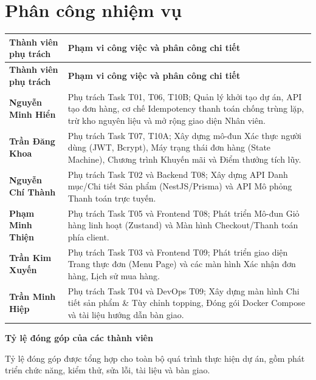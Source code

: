 \documentclass[12pt,a4paper]{report}
\begin{document}
\section{Phân công nhiệm vụ}

\begingroup
\small
\setlength{\tabcolsep}{5pt}
\renewcommand{\arraystretch}{1.2}
\begin{longtable}{|>{\raggedright\arraybackslash}p{}|>{\raggedright\arraybackslash}p{}|}
\hline
\textbf{Thành viên phụ trách} & \textbf{Phạm vi công việc và phân công chi tiết} \\ \hline
\endfirsthead
\hline
\textbf{Thành viên phụ trách} & \textbf{Phạm vi công việc và phân công chi tiết} \\ \hline
\endhead
\endfoot
\endlastfoot
\textbf{Nguyễn Minh Hiển} & Phụ trách Task T01, T06, T10B; Quản lý khởi tạo dự án, API tạo đơn hàng, cơ chế Idempotency thanh toán chống trùng lặp, trừ kho nguyên liệu và mở rộng giao diện Nhân viên. \\ \hline
\textbf{Trần Đăng Khoa} & Phụ trách Task T07, T10A; Xây dựng mô-đun Xác thực người dùng (JWT, Bcrypt), Máy trạng thái đơn hàng (State Machine), Chương trình Khuyến mãi và Điểm thưởng tích lũy. \\ \hline
\textbf{Nguyễn Chí Thành} & Phụ trách Task T02 và Backend T08; Xây dựng API Danh mục/Chi tiết Sản phẩm (NestJS/Prisma) và API Mô phỏng Thanh toán trực tuyến. \\ \hline
\textbf{Phạm Minh Thiện} & Phụ trách Task T05 và Frontend T08; Phát triển Mô-đun Giỏ hàng linh hoạt (Zustand) và Màn hình Checkout/Thanh toán phía client. \\ \hline
\textbf{Trần Kim Xuyến} & Phụ trách Task T03 và Frontend T09; Phát triển giao diện Trang thực đơn (Menu Page) và các màn hình Xác nhận đơn hàng, Lịch sử mua hàng. \\ \hline
\textbf{Trần Minh Hiệp} & Phụ trách Task T04 và DevOps T09; Xây dựng màn hình Chi tiết sản phẩm \& Tùy chỉnh topping, Đóng gói Docker Compose và tài liệu hướng dẫn bàn giao. \\ \hline
\end{longtable}
\endgroup


\textbf{Tỷ lệ đóng góp của các thành viên}

Tỷ lệ đóng góp được tổng hợp cho toàn bộ quá trình thực hiện dự án, gồm phát triển chức năng, kiểm thử, sửa lỗi, tài liệu và bàn giao.
\end{document}
